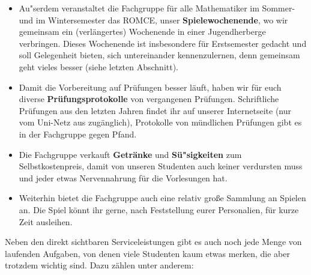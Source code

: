 \begin{itemize}
\item
Au"serdem veranstaltet die Fachgruppe für alle Mathematiker
im Sommer- und im Wintersemester das ROMCE, unser {\bf Spielewochenende},
wo wir gemeinsam ein (verlängertes) Wochenende in einer Jugendherberge verbringen.
Dieses Wochenende ist insbesondere für Erstsemester
gedacht und soll Gelegenheit bieten, sich untereinander kennenzulernen,
denn gemeinsam geht vieles besser
(siehe letzten Abschnitt).

\item
Damit die Vorbereitung auf Prüfungen besser läuft,
haben wir für euch diverse {\bf Prüfungsprotokolle} von vergangenen Prüfungen.
Schriftliche Prüfungen aus den letzten Jahren
findet ihr auf unserer Internetseite (nur vom Uni-Netz aus zugänglich),
Protokolle von mündlichen Prüfungen gibt es in der Fachgruppe gegen Pfand.

\item
Die Fachgruppe verkauft  {\bf Getränke} und {\bf Sü"sigkeiten}
zum Selbstkostenpreis, damit von unseren Studenten
auch keiner verdursten muss und jeder etwas Nervennahrung für die Vorlesungen hat.

\item
Weiterhin bietet die Fachgruppe auch eine relativ große Sammlung an Spielen an.
Die Spiel könnt ihr gerne, nach Feststellung eurer Personalien, für kurze Zeit ausleihen.
\end{itemize}

Neben den direkt sichtbaren Serviceleistungen gibt es
auch noch jede Menge von laufenden Aufgaben,
von denen viele Studenten kaum etwas merken,
die aber trotzdem wichtig sind. Dazu zählen unter anderem:

